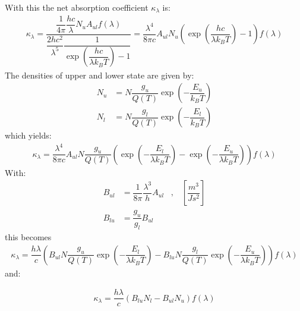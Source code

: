 With this the net absorption coefficient $\kappa_\lambda$ is:
\begin{align}
\kappa_\lambda = \dfrac{\dfrac{1}{4 \pi} \dfrac{h c}{\lambda} N_u A_{ul} f(\lambda) }{\dfrac{2 h c^2}{\lambda^5} \dfrac{1}{\exp\left(\dfrac{h c}{\lambda k_B T}\right) - 1}} =
\dfrac{\lambda^4 }{8 \pi c} A_{ul} N_u  \left(\exp\left(\dfrac{h c}{\lambda k_B T}\right) - 1\right) f(\lambda)
\end{align}
The densities of upper and lower state are given by:
\begin{align}
N_u &= N \dfrac{g_u}{Q(T)} \exp\left(- \dfrac{E_u}{k_B T} \right) \\
N_l &= N \dfrac{g_l}{Q(T)} \exp\left(- \dfrac{E_l}{k_B T} \right)
\end{align}
which yields:
\begin{align}
\kappa_\lambda  =
\dfrac{\lambda^4 }{8 \pi c} A_{ul} N \dfrac{g_u}{Q(T)}
\left( \exp\left(-\dfrac{E_l}{\lambda k_B T}\right) - \exp\left(-\dfrac{E_u}{\lambda k_B T}\right) \right) f(\lambda)
\end{align}
With:
\begin{align}
B_{ul} &= \dfrac{1}{8 \pi} \dfrac{\lambda^3}{h} A_{ul} \;\;\; , \;\;\; \left[\dfrac{m^3}{J s^2}\right] \\
B_{lu} &= \dfrac{g_u}{g_l} B_{ul}
\end{align}
this becomes
\begin{align}
\kappa_\lambda  =
\dfrac{h \lambda }{c}  
\left(  B_{ul} N \dfrac{g_u}{Q(T)} \exp\left(-\dfrac{E_l}{\lambda k_B T}\right) - 
B_{lu} N \dfrac{g_l}{Q(T)} \exp\left(-\dfrac{E_u}{\lambda k_B T}\right) \right) f(\lambda)
\end{align}
and:

\begin{align}
\kappa_\lambda  = \dfrac{h \lambda }{c}  
\left(  B_{lu} N_l -  B_{ul} N_u \right) f(\lambda)
\end{align}


